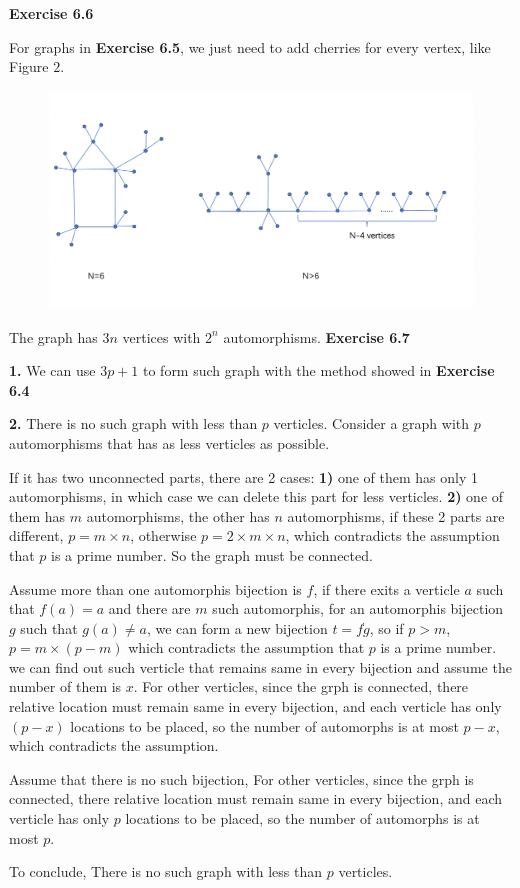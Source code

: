 \documentclass{article} %
\begin{document}
	\textbf{Exercise 6.6}\par
	For graphs in \textbf{Exercise 6.5}, we just need to add cherries for every vertex, like Figure $2$.
	\begin{figure}[H]
  	\centering
  	\includegraphics[scale=0.4]{66.png}
  	\caption{}
  	\label{fig:7}
  	\end{figure}
	The graph has $3n$ vertices with $2^{n}$ automorphisms.
	\textbf{Exercise 6.7}\par
	\textbf{1.} We can use $3p+1$ to form such graph with the method showed in \textbf{Exercise 6.4}\par
	\textbf{2.} There is no such graph with less than $p$ verticles. Consider a graph with $p$ automorphisms that has as less verticles as possible.\par 
	If it has two unconnected parts, there are 2 cases: \textbf{1)} one of them has only 1 automorphisms, in which case we can delete this part for less verticles. \textbf{2)} one of them has $m$  automorphisms, the other has $n$ automorphisms, if these 2 parts are different, $p=m \times n$, otherwise $p=2\times m\times n$, which contradicts the assumption that $p$ is a prime number. So the graph must be connected.\par 
	Assume more than one automorphis bijection is $f$, if there exits a verticle $a$ such that $f(a)=a$ and there are $m$ such automorphis, for an automorphis bijection $g$ such that $g(a) \not=a$, we can form a new bijection $t=f \dot g$, so if $p>m$,$p=m\times (p-m) $  
	which contradicts the assumption that $p$ is a prime number. we can find out such verticle that remains same in every bijection and assume the number of them is $x$. For other verticles, since the grph is connected, there relative location must remain same in every bijection, and each verticle has only $(p-x)$ locations to be placed, so the number of automorphs is at most $p-x$, which contradicts the assumption. \par
	Assume that there is no such bijection, For other verticles, since the grph is connected, there relative location must remain same in every bijection, and each verticle has only $p$ locations to be placed, so the number of automorphs is at most $p$.\par
	To conclude, There is no such graph with less than $p$ verticles.	\par
\end{document}
